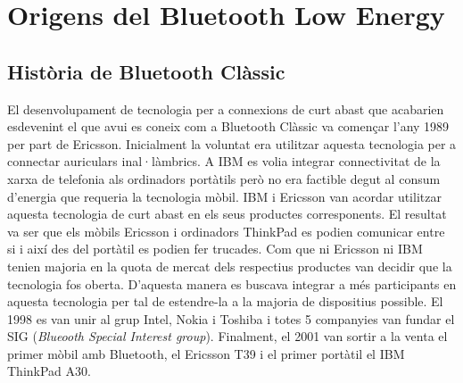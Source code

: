 \chapter{Origens del Bluetooth Low Energy}\label{C:compaginacio}



\section{Història de Bluetooth Clàssic}
El desenvolupament de tecnologia per a connexions de curt abast que acabarien esdevenint el que avui es coneix com a Bluetooth Clàssic va començar l'any 1989 per part de Ericsson.
Inicialment la voluntat era utilitzar aquesta tecnologia per a connectar auriculars inal·làmbrics.
A IBM es volia integrar connectivitat de la xarxa de telefonia als ordinadors portàtils però no era factible degut al consum d'energia que requeria la tecnologia mòbil.
IBM i Ericsson van acordar utilitzar aquesta tecnologia de curt abast en els seus productes corresponents.
El resultat va ser que els mòbils Ericsson i ordinadors ThinkPad es podien comunicar entre si i així des del portàtil es podien fer trucades.
Com que ni Ericsson ni IBM tenien majoria en la quota de mercat dels respectius productes van decidir que la tecnologia fos oberta.
D'aquesta manera es buscava integrar a més participants en aquesta tecnologia per tal de estendre-la a la majoria de dispositius possible.
El 1998 es van unir al grup Intel, Nokia i Toshiba i totes 5 companyies  van fundar el SIG  (\textit{Blueooth Special Interest group}).
Finalment, el 2001 van sortir a la venta el primer mòbil amb Bluetooth, el Ericsson T39 i el primer portàtil el IBM ThinkPad A30.

